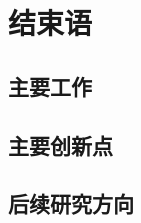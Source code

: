 \chapter{结束语}
\label{chap:con}

\section{主要工作}
\label{sec:con:job}
\section{主要创新点}
\label{sec:con:creativity}
\section{后续研究方向}
\label{sec:con:future}